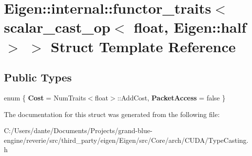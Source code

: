 \hypertarget{struct_eigen_1_1internal_1_1functor__traits_3_01scalar__cast__op_3_01float_00_01_eigen_1_1half_01_4_01_4}{}\section{Eigen\+::internal\+::functor\+\_\+traits$<$ scalar\+\_\+cast\+\_\+op$<$ float, Eigen\+::half $>$ $>$ Struct Template Reference}
\label{struct_eigen_1_1internal_1_1functor__traits_3_01scalar__cast__op_3_01float_00_01_eigen_1_1half_01_4_01_4}
\subsection*{Public Types}
\begin{DoxyCompactItemize}
\item 
\mbox{\label{struct_eigen_1_1internal_1_1functor__traits_3_01scalar__cast__op_3_01float_00_01_eigen_1_1half_01_4_01_4_a565409d47292be281ed6392980085da8}} 
enum \{ {\bfseries Cost} = Num\+Traits$<$float$>$\+::Add\+Cost, 
{\bfseries Packet\+Access} = false
 \}
\end{DoxyCompactItemize}


The documentation for this struct was generated from the following file\+:\begin{DoxyCompactItemize}
\item 
C\+:/\+Users/dante/\+Documents/\+Projects/grand-\/blue-\/engine/reverie/src/third\+\_\+party/eigen/\+Eigen/src/\+Core/arch/\+C\+U\+D\+A/Type\+Casting.\+h\end{DoxyCompactItemize}
